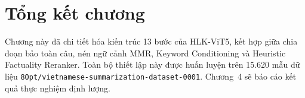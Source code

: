 \section{Tổng kết chương}

Chương này đã chi tiết hóa kiến trúc 13 bước của HLK-ViT5, kết hợp giữa chia đoạn bảo toàn câu, nén ngữ cảnh MMR, Keyword Conditioning và Heuristic Factuality Reranker. Toàn bộ thiết lập này được huấn luyện trên 15.620 mẫu dữ liệu \texttt{8Opt/vietnamese-summarization-dataset-0001}. Chương~4 sẽ báo cáo kết quả thực nghiệm định lượng.
